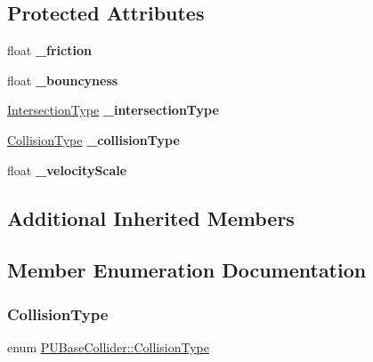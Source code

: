 \subsection*{Protected Attributes}
\begin{DoxyCompactItemize}
\item 
\mbox{\label{classPUBaseCollider_a576dd960fab8a283ec86d2a3519ac755}} 
float {\bfseries \+\_\+friction}
\item 
\mbox{\label{classPUBaseCollider_ad04723ede6a13e4cb0f644bfc0e22d75}} 
float {\bfseries \+\_\+bouncyness}
\item 
\mbox{\label{classPUBaseCollider_a67bd0777ca55c4efaf5bd7f677cdf0c7}} 
\hyperlink{classPUBaseCollider_ae86fc81f78c00a88e8e927377a86e81c}{Intersection\+Type} {\bfseries \+\_\+intersection\+Type}
\item 
\mbox{\label{classPUBaseCollider_a531dd2017e3e9e345b57a19703b29aea}} 
\hyperlink{classPUBaseCollider_a13f646d7a12d1abb3cca3043c817e726}{Collision\+Type} {\bfseries \+\_\+collision\+Type}
\item 
\mbox{\label{classPUBaseCollider_ac5f7be7143ed964a2b55ec3329820b3c}} 
float {\bfseries \+\_\+velocity\+Scale}
\end{DoxyCompactItemize}
\subsection*{Additional Inherited Members}


\subsection{Member Enumeration Documentation}
\mbox{\label{classPUBaseCollider_a13f646d7a12d1abb3cca3043c817e726}} 
\subsubsection{\texorpdfstring{Collision\+Type}{CollisionType}\hspace{0.1cm}{\footnotesize\ttfamily [1/2]}}
{\footnotesize\ttfamily enum \hyperlink{classPUBaseCollider_a13f646d7a12d1abb3cca3043c817e726}{P\+U\+Base\+Collider\+::\+Collision\+Type}}

